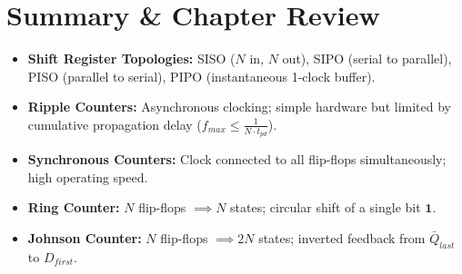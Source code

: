 \section{Summary \& Chapter Review}
\begin{quickrevision}
\begin{itemize}
    \item \textbf{Shift Register Topologies:} SISO ($N$ in, $N$ out), SIPO (serial to parallel), PISO (parallel to serial), PIPO (instantaneous 1-clock buffer).
    \item \textbf{Ripple Counters:} Asynchronous clocking; simple hardware but limited by cumulative propagation delay ($f_{max} \le \frac{1}{N \cdot t_{pd}}$).
    \item \textbf{Synchronous Counters:} Clock connected to all flip-flops simultaneously; high operating speed.
    \item \textbf{Ring Counter:} $N$ flip-flops $\implies N$ states; circular shift of a single bit $\mathbf{1}$.
    \item \textbf{Johnson Counter:} $N$ flip-flops $\implies 2N$ states; inverted feedback from $\bar{Q}_{last}$ to $D_{first}$.
\end{itemize}
\end{quickrevision}
